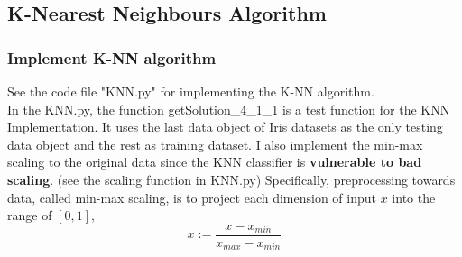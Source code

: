 \documentclass[11pt,a4paper]{article}
\newcommand{\htab}{\hspace*{0.63cm}}
\begin{document}
\subsection{K-Nearest Neighbours Algorithm}
\subsubsection{Implement K-NN algorithm}
\htab See the code file "KNN.py" for implementing the K-NN algorithm. \\
\htab In the KNN.py, the function getSolution\_4\_1\_1 is a test function for the KNN Implementation. It uses the last data object of Iris datasets as the only testing data object and the rest as training dataset. 
\htab I also implement the min-max scaling to the original data since the KNN classifier is \textbf{vulnerable to bad scaling}. (see the scaling function in KNN.py) Specifically, preprocessing towards data, called min-max scaling, is to project each dimension of input $x$ into the range of $[0,1]$,
\begin{equation}
    x := \frac{x - x_{min}}{x_{max} - x_{min}}
\end{equation}
\end{document}
